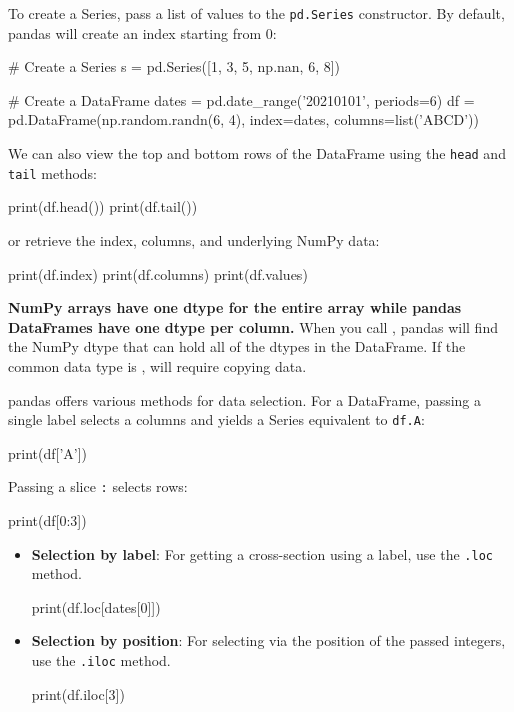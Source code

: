 To create a Series, pass a list of values to the \texttt{pd.Series} constructor. By default, pandas will create an index starting from 0:

\begin{codeblock}[language=python]
    # Create a Series
    s = pd.Series([1, 3, 5, np.nan, 6, 8])

    # Create a DataFrame
    dates = pd.date_range('20210101', periods=6)
    df = pd.DataFrame(np.random.randn(6, 4), index=dates, columns=list('ABCD'))
\end{codeblock}

We can also view the top and bottom rows of the DataFrame using the \texttt{head} and \texttt{tail} methods:

\begin{codeblock}[language=python]
    print(df.head())
    print(df.tail())
\end{codeblock}
 
or retrieve the index, columns, and underlying NumPy data:

\begin{codeblock}[language=python]
    print(df.index)
    print(df.columns)
    print(df.values)
\end{codeblock}

\begin{observationblock}
    \textbf{NumPy arrays have one dtype for the entire array while pandas DataFrames have one
    dtype per column.} When you call , pandas will find the NumPy dtype
    that can hold all of the dtypes in the DataFrame. If the common data type is ,  will require copying data.
\end{observationblock}

pandas offers various methods for data selection. For a DataFrame, passing a single label selects a columns and yields a Series equivalent to
\texttt{df.A}:

\begin{codeblock}[language=python]
    print(df['A'])
\end{codeblock}

Passing a slice \texttt{:} selects rows:

\begin{codeblock}[language=python]
    print(df[0:3])
\end{codeblock}

\begin{itemize}
    \item \textbf{Selection by label}: For getting a cross-section using a label, use the \texttt{.loc} method.
    \begin{codeblock}[language=python]
        print(df.loc[dates[0]])
    \end{codeblock}
    \item \textbf{Selection by position}: For selecting via the position of the passed integers, use the \texttt{.iloc} method.
    \begin{codeblock}[language=python]
        print(df.iloc[3])
    \end{codeblock}
\end{itemize}

